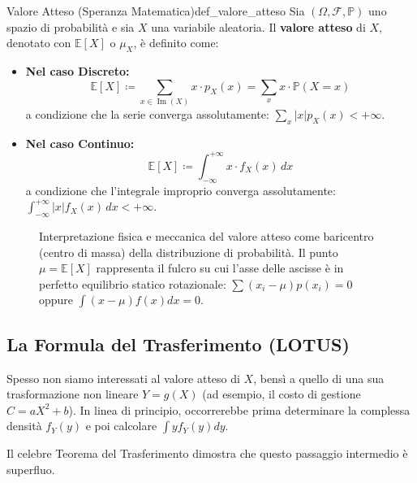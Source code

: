 \begin{definizione}{Valore Atteso (Speranza Matematica)}{def_valore_atteso}
Sia $(\Omega, \mathcal{F}, \mathbb{P})$ uno spazio di probabilità e sia $X$ una variabile aleatoria. Il \textbf{valore atteso} di $X$, denotato con $\mathbb{E}[X]$ o $\mu_X$, è definito come:
\begin{itemize}
    \item \textbf{Nel caso Discreto:}
    \begin{equation}
        \mathbb{E}[X] \coloneqq \sum_{x \in \operatorname{Im}(X)} x \cdot p_X(x) = \sum_{x} x \cdot \mathbb{P}(X = x)
    \end{equation}
    a condizione che la serie converga assolutamente: $\sum_{x} |x| p_X(x) < +\infty$.
    \item \textbf{Nel caso Continuo:}
    \begin{equation}
        \mathbb{E}[X] \coloneqq \int_{-\infty}^{+\infty} x \cdot f_X(x) \, dx
    \end{equation}
    a condizione che l'integrale improprio converga assolutamente: $\int_{-\infty}^{+\infty} |x| f_X(x) \, dx < +\infty$.
\end{itemize}
\end{definizione}

\begin{figure}[htbp]
    \centering
    
    \caption{Interpretazione fisica e meccanica del valore atteso come baricentro (centro di massa) della distribuzione di probabilità. Il punto $\mu = \mathbb{E}[X]$ rappresenta il fulcro su cui l'asse delle ascisse è in perfetto equilibrio statico rotazionale: $\sum (x_i - \mu)p(x_i) = 0$ oppure $\int (x - \mu)f(x)dx = 0$.}
    \label{fig:baricentro_valore_atteso}
\end{figure}

\subsection{La Formula del Trasferimento (LOTUS)}

Spesso non siamo interessati al valore atteso di $X$, bensì a quello di una sua trasformazione non lineare $Y = g(X)$ (ad esempio, il costo di gestione $C = a X^2 + b$). In linea di principio, occorrerebbe prima determinare la complessa densità $f_Y(y)$ e poi calcolare $\int y f_Y(y) dy$. 

Il celebre Teorema del Trasferimento dimostra che questo passaggio intermedio è superfluo.

